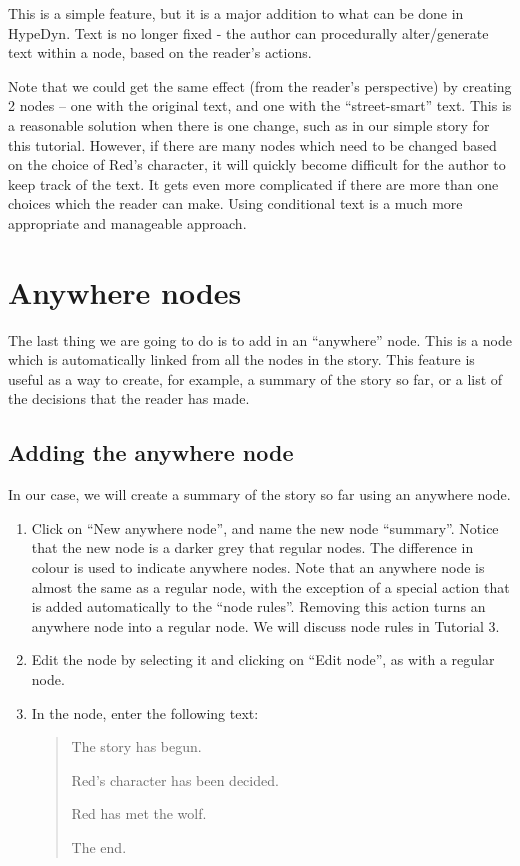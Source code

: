 \documentclass{article}
\begin{document}
This is a simple feature, but it is a major addition to what can be done in
HypeDyn. Text is no longer fixed - the author can procedurally alter/generate
text within a node, based on the reader's actions. 

Note that we could get the same effect (from the reader's perspective) by
creating 2 nodes -- one with the original text, and one with the ``street-smart''
text. This is a reasonable solution when there is one change, such as in our
simple story for this tutorial. However, if there are many nodes which need to
be changed based on the choice of Red's character, it will quickly become
difficult for the author to keep track of the text. It gets even more
complicated if there are more than one choices which the reader can make. Using
conditional text is a much more appropriate and manageable approach.

\section{Anywhere nodes}

The last thing we are going to do is to add in an ``anywhere'' node. This is a
node which is automatically linked from all the nodes in the story. This
feature is useful as a way to create, for example, a summary of the story so
far, or a list of the decisions that the reader has made. 

\subsection{Adding the anywhere node}
In our case, we will create a summary of the story so far using an anywhere
node.

\begin{enumerate}
  \item Click on ``New anywhere node'', and name the new node ``summary''.
  Notice that the new node is a darker grey that regular nodes. The difference
  in colour is used to indicate anywhere nodes. Note that an anywhere node is 
  almost the same as a regular node, with the exception of a special action that
  is added automatically to the ``node rules''. Removing this action turns an
  anywhere node into a regular node. We will discuss node rules in Tutorial 3.

  \item Edit the node by selecting it and clicking on ``Edit node'', as with a
  regular node.

  \item In the node, enter the following text:
  \begin{quotation}
  \noindent The story has begun.
  
  \bigskip
  
  \noindent Red's character has been decided.

  \bigskip

  \noindent Red has met the wolf.

  \bigskip

  \noindent The end.
  \end{quotation}
\end{enumerate}
\end{document}
